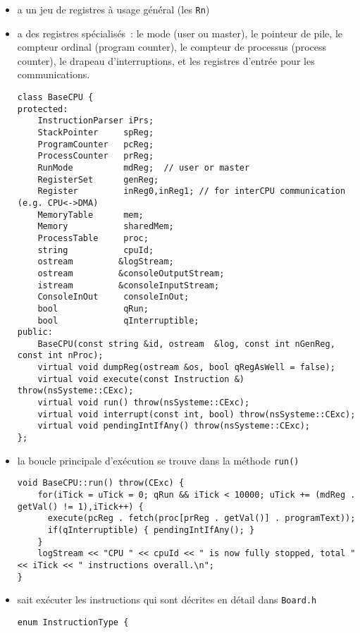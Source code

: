 \documentclass{article}
\begin{document}
\begin{itemize}
\item a un jeu de registres \`a usage g\'en\'eral (les \texttt{Rn})
\item a des registres sp\'ecialis\'es~: le mode (user ou master), le pointeur
  de pile, le compteur ordinal (program counter), le compteur de processus
  (process counter), le drapeau d'interruptions, et les registres d'entr\'ee
  pour les communications.
\begin{verbatim}
class BaseCPU {
protected:
    InstructionParser iPrs;
    StackPointer     spReg; 
    ProgramCounter   pcReg;
    ProcessCounter   prReg; 
    RunMode          mdReg;  // user or master
    RegisterSet      genReg;
    Register         inReg0,inReg1; // for interCPU communication (e.g. CPU<->DMA) 
    MemoryTable      mem;
    Memory           sharedMem;
    ProcessTable     proc;
    string           cpuId;
    ostream         &logStream;
    ostream         &consoleOutputStream;
    istream         &consoleInputStream;
    ConsoleInOut     consoleInOut;
    bool             qRun;
    bool             qInterruptible;
public:
    BaseCPU(const string &id, ostream  &log, const int nGenReg, const int nProc);
    virtual void dumpReg(ostream &os, bool qRegAsWell = false);
    virtual void execute(const Instruction &) throw(nsSysteme::CExc);
    virtual void run() throw(nsSysteme::CExc);
    virtual void interrupt(const int, bool) throw(nsSysteme::CExc);
    virtual void pendingIntIfAny() throw(nsSysteme::CExc);
};
\end{verbatim}
\item la boucle principale d'ex\'ecution se trouve dans la m\'ethode
  \texttt{run()}
\begin{verbatim}
void BaseCPU::run() throw(CExc) {
    for(iTick = uTick = 0; qRun && iTick < 10000; uTick += (mdReg . getVal() != 1),iTick++) {
      execute(pcReg . fetch(proc[prReg . getVal()] . programText));
      if(qInterruptible) { pendingIntIfAny(); }
    }
    logStream << "CPU " << cpuId << " is now fully stopped, total " << iTick << " instructions overall.\n";
}
\end{verbatim}
\item sait ex\'ecuter les instructions qui sont d\'ecrites en d\'etail dans \texttt{Board.h} 

\begin{verbatim}
enum InstructionType {


\end{verbatim}
\end{itemize}
\end{document}
